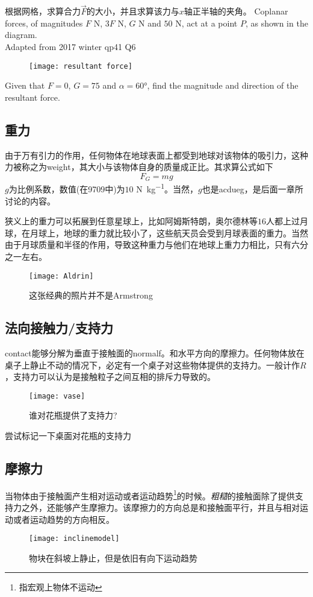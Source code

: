\begin{TaskBox}
根据网格，求算合力$\vec{F}$的大小，并且求算该力与$x$轴正半轴的夹角。
\tcblower
Coplanar forces, of magnitudes $F$ \si{\newton}, $3F$ \si{\newton}, $G$ \si{\newton} and $50$ \si{\newton}, act at a point $P$, as shown in the diagram.\\
\makebox{}\hfill Adapted from 2017 winter qp41 Q6
\begin{figure}[H] 
\centering
\texttt{[image: resultant force]}
\end{figure}
Given that $F = 0$, $G = 75$ and $\alpha = 60$\si{\degree}, ﬁnd the magnitude and direction of the resultant force.
\end{TaskBox}


\subsection*{重力}
由于万有引力的作用，任何物体在地球表面上都受到地球对该物体的吸引力，这种力被称之为\gls{weight}，其大小与该物体自身的质量成正比。其求算公式如下
\[
	F_G=mg
\]
$g$为比例系数，数值(在9709中)为$10$ \si{\newton\per\kg}。当然，$g$也是\gls{acdueg}，是后面一章所讨论的内容。

狭义上的重力可以拓展到任意星球上，比如阿姆斯特朗，奥尔德林等$16$人都上过月球，在月球上，地球的重力就比较小了，这些航天员会受到月球表面的重力。当然由于月球质量和半径的作用，导致这种重力与他们在地球上重力力相比，只有六分之一左右。
\begin{figure}[H]
\centering
\texttt{[image: Aldrin]}
\caption{这张经典的照片并不是Armstrong}
\end{figure}


\subsection*{法向接触力/支持力}
\gls{contact}能够分解为垂直于接触面的\gls{normalf}。和水平方向的摩擦力。任何物体放在桌子上静止不动的情况下，必定有一个桌子对这些物体提供的支持力。一般计作$R$，支持力可以认为是接触粒子之间互相的排斥力导致的。
\begin{figure}[H]
\centering
\texttt{[image: vase]}
\caption{谁对花瓶提供了支持力?}
\end{figure}

\begin{TaskBox}
尝试标记一下桌面对花瓶的支持力
\end{TaskBox}


\subsection*{摩擦力}
当物体由于接触面产生相对运动或者运动趋势\footnote{指宏观上物体不运动}的时候。\emph{粗糙}的接触面除了提供支持力之外，还能够产生摩擦力。该摩擦力的方向总是和接触面平行，并且与相对运动或者运动趋势的方向相反。 
\begin{figure}[H]
\centering
\texttt{[image: inclinemodel]}
\caption{物块在斜坡上静止，但是依旧有向下运动趋势}
\label{fig:inclinemodel}
\end{figure}

